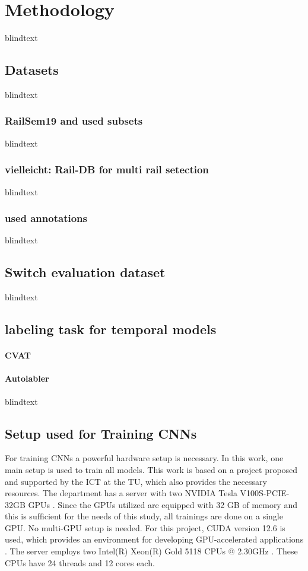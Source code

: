 \chapter{Methodology}
\label{sec:methodology}
blindtext

\section{Datasets}
blindtext

\subsection{RailSem19 and used subsets}
blindtext

\subsection{vielleicht: Rail-DB for multi rail setection}
blindtext

\subsection{used annotations}
blindtext

\section{Switch evaluation dataset}
blindtext

\section{labeling task for temporal models}

\subsubsection{CVAT}
\subsubsection{Autolabler}
blindtext

\section{Setup used for Training CNNs}

For training \ac{CNN}s a powerful hardware setup is necessary.
In this work, one main setup is used to train all models.
This work is based on a project proposed and supported by the \ac{ICT} at the \ac{TU}, which also provides the necessary resources.
The department has a server with two NVIDIA Tesla V100S-PCIE-32GB \ac{GPU}s \cite{nvidia_v100_datasheet}.
Since the \ac{GPU}s utilized are equipped with 32 GB of memory and this is sufﬁcient for the needs of this study, all trainings are done on a single \ac{GPU}.
No multi-\ac{GPU} setup is needed.
For this project, CUDA version 12.6 is used, which provides an environment for developing GPU-accelerated applications \cite{nvidia_cuda_126}.
The server employs two Intel(R) Xeon(R) Gold 5118 CPUs @ 2.30GHz \cite{intel_xeon_gold_prozessor_5118}.
These \ac{CPU}s have 24 threads and 12 cores each.

